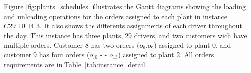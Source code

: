 \documentclass{article}
\begin{document}
\begin{table}[htbp]
    \centering
    \caption{RMC delivered within different runtimes}
    \label{tab:runtime}
    \scriptsize

\end{table}

Figure \ref*{fig:plants_schedules} illustrates the Gantt diagrams showing the loading and unloading operations for the orders assigned to each plant in instance $C29\_10\_14\_3$. It also shows the differents assignments of each driver throughout the day. This instance has three plants, $29$ drivers, and two customers wich have multiple orders. Customer $8$ has two orders ($o_8$,$o_9$) assigned to plant $0$, and customer $9$ has four orders ($o_{10}$ - - $o_{13}$) assigned to plant $2$. All orders requirements are in Table~\ref*{tab:instance_detail}.
\end{document}
